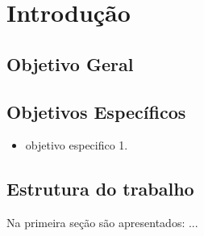 \chapter{Introdução}\label{ch:introducao}

\section{Objetivo Geral}\label{sec:objetivogeral}


\section{Objetivos Específicos}\label{sec:objetivoesp}

	\begin{itemize}
		\item objetivo especifico 1.
	\end{itemize}

\section{Estrutura do trabalho}\label{sec:estruturatrab}

Na primeira seção são apresentados: ...
